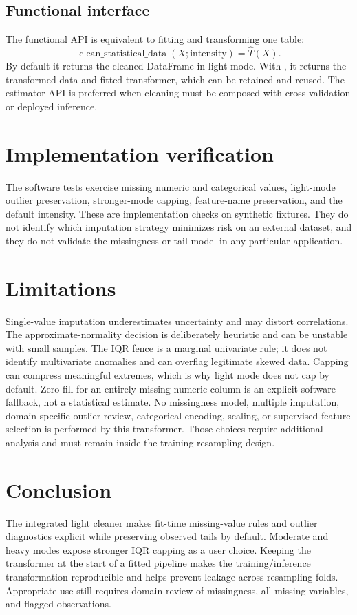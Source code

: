 \documentclass[conference]{IEEEtran}
\begin{document}
\subsection{Functional interface}
The functional API is equivalent to fitting and transforming one table:
\[
\operatorname{clean\_statistical\_data}(X;\text{intensity})
=\widehat T(X).
\]
By default it returns the cleaned DataFrame in light mode. With , it returns the transformed data and fitted transformer, which can be retained and reused. The estimator API is preferred when cleaning must be composed with cross-validation or deployed inference.

\section{Implementation verification}
The software tests exercise missing numeric and categorical values, light-mode outlier preservation, stronger-mode capping, feature-name preservation, and the default intensity. These are implementation checks on synthetic fixtures. They do not identify which imputation strategy minimizes risk on an external dataset, and they do not validate the missingness or tail model in any particular application.

\section{Limitations}
Single-value imputation underestimates uncertainty and may distort correlations. The approximate-normality decision is deliberately heuristic and can be unstable with small samples. The IQR fence is a marginal univariate rule; it does not identify multivariate anomalies and can overflag legitimate skewed data. Capping can compress meaningful extremes, which is why light mode does not cap by default. Zero fill for an entirely missing numeric column is an explicit software fallback, not a statistical estimate. No missingness model, multiple imputation, domain-specific outlier review, categorical encoding, scaling, or supervised feature selection is performed by this transformer. Those choices require additional analysis and must remain inside the training resampling design.

\section{Conclusion}
The integrated light cleaner makes fit-time missing-value rules and outlier diagnostics explicit while preserving observed tails by default. Moderate and heavy modes expose stronger IQR capping as a user choice. Keeping the transformer at the start of a fitted pipeline makes the training/inference transformation reproducible and helps prevent leakage across resampling folds. Appropriate use still requires domain review of missingness, all-missing variables, and flagged observations.
\end{document}
